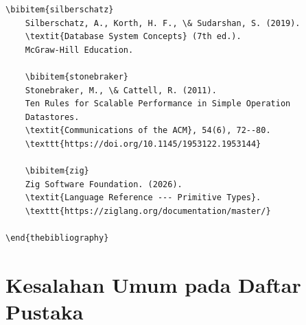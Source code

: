 \documentclass[11pt,a4paper]{article}
\begin{document}
\begin{lstlisting}[style=code]
	\bibitem{silberschatz}
	Silberschatz, A., Korth, H. F., \& Sudarshan, S. (2019).
	\textit{Database System Concepts} (7th ed.).
	McGraw-Hill Education.

	\bibitem{stonebraker}
	Stonebraker, M., \& Cattell, R. (2011).
	Ten Rules for Scalable Performance in Simple Operation
	Datastores.
	\textit{Communications of the ACM}, 54(6), 72--80.
	\texttt{https://doi.org/10.1145/1953122.1953144}

	\bibitem{zig}
	Zig Software Foundation. (2026).
	\textit{Language Reference --- Primitive Types}.
	\texttt{https://ziglang.org/documentation/master/}

\end{thebibliography}
\end{lstlisting}

\section{Kesalahan Umum pada Daftar Pustaka}
\end{document}
